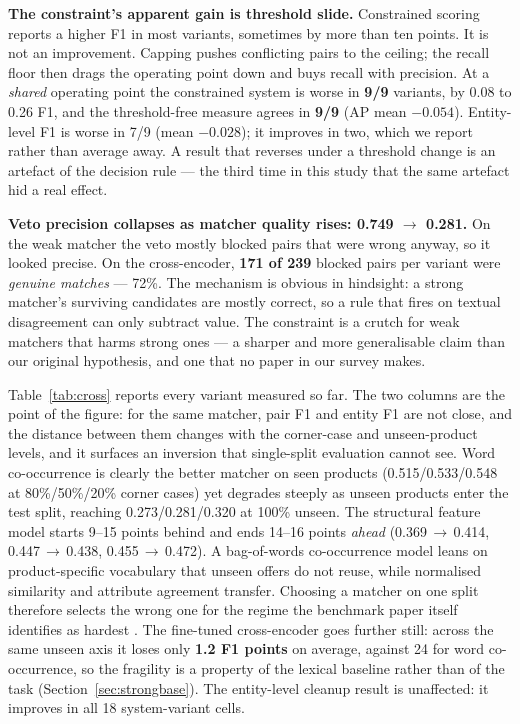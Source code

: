 \documentclass[conference]{IEEEtran}
\begin{document}
\textbf{The constraint's apparent gain is threshold slide.} Constrained scoring reports a higher F1 in most
variants, sometimes by more than ten points. It is not an improvement. Capping pushes conflicting pairs to
the ceiling; the recall floor then drags the operating point down and buys recall with precision. At a
\emph{shared} operating point the constrained system is worse in \textbf{9/9} variants, by 0.08 to 0.26
F1, and the threshold-free measure agrees in \textbf{9/9} (AP mean $-0.054$). Entity-level F1 is worse in
7/9 (mean $-0.028$); it improves in two, which we report rather than average away. A result that reverses
under a threshold change is an artefact of the decision rule --- the third time in this study that the same
artefact hid a real effect.

\textbf{Veto precision collapses as matcher quality rises: 0.749 $\rightarrow$ 0.281.} On the weak matcher
the veto mostly blocked pairs that were wrong anyway, so it looked precise. On the cross-encoder,
\textbf{171 of 239} blocked pairs per variant were \emph{genuine matches} --- 72\%. The mechanism is
obvious in hindsight: a strong matcher's surviving candidates are mostly correct, so a rule that fires on
textual disagreement can only subtract value. The constraint is a crutch for weak matchers that harms
strong ones --- a sharper and more generalisable claim than our original hypothesis, and one that no paper
in our survey makes.


\label{sec:variants}


Table~\ref{tab:cross} reports every variant measured so far. The two columns are the point of the figure:
for the same matcher, pair F1 and entity F1 are not close, and the distance between them changes with the
corner-case and unseen-product levels, and it surfaces an inversion that single-split evaluation cannot see.
Word co-occurrence is clearly the better matcher on seen products (0.515/0.533/0.548 at 80\%/50\%/20\%
corner cases) yet degrades steeply as unseen products enter the test split, reaching 0.273/0.281/0.320 at
100\% unseen. The structural feature model starts 9--15 points behind and ends 14--16 points \emph{ahead}
(0.369\,$\rightarrow$\,0.414, 0.447\,$\rightarrow$\,0.438, 0.455\,$\rightarrow$\,0.472). A
bag-of-words co-occurrence model leans on product-specific vocabulary that unseen offers do not reuse, while
normalised similarity and attribute agreement transfer. Choosing a matcher on one split therefore selects
the wrong one for the regime the benchmark paper itself identifies as hardest \cite{peeters2024wdc}. The
fine-tuned cross-encoder goes further still: across the same unseen axis it loses only \textbf{1.2 F1
points} on average, against 24 for word co-occurrence, so the fragility is a property of the lexical
baseline rather than of the task (Section~\ref{sec:strongbase}). The entity-level cleanup result is
unaffected: it improves in all 18 system-variant cells.
\end{document}
